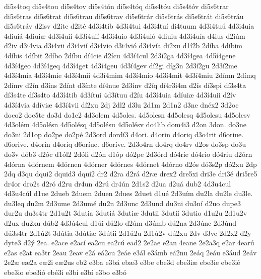 {di5s4toq
di5s4tou
di5s4tov
di5s4t^^f3n
di5s4t^^f3q
di5s4t^^f3u
di5s4t^^f3v
di5s6trar
di5s6tras
di5s6trat
di5s6trau
di5s6trav
di5s6tr^^e1r
di5s6tr^^e1s
di5s6tr^^e1t
di5s6tr^^e1u
di5s6tr^^e1v
d2isv
d2ite
d2it^^e9
4d3i4tib
4d3i4tui
4d3i4tu^^ed
di4tuum
4d3i4tu^^fa
4d3i4uia
4diui^^e1
4diui^^e6
4d3i4uii
4d3i4ui^^ed
4d3i4uio
4d3i4ui^^f3
4diuiu
4d3i4u^^eda
d4ius
d2i^^fam
d2iv
d3i4via
d3i4vii
d3i4vi^^ed
d3i4vio
d3i4vi^^f3
d3i4v^^eda
di2xu
d1^^ed2b
2d^^edba
4d^^edbim
4d^^edbis
4d^^edbit
2d^^edbo
2d^^edbu
d^^ed4cie
d2^^edcu
4d3^^ed4cul
2d3^^ed2ga
4d3^^ed4gea
4d5^^ed4gene
4d3^^ed4geo
4d3^^ed4geq
4d3^^ed4get
4d3^^ed4geu
4d3^^ed4gev
d^^ed2gi
d^^edg3n
2d3^^ed2gu
2d3^^ed2me
4d3^^ed4mia
4d3^^ed4mie
4d3^^ed4mii
4d3^^ed4mim
4d3^^ed4mio
4d3^^ed4mit
4d3^^ed4miu
2d^^edmn
2d^^edmq
2d^^edmv
d2^^edn
d3^^edns
2d^^ednt
d3^^ednte
d^^ed4nue
2d3^^ednv
d2^^edq
d^^ed4r3i4m
d2^^eds
d^^ed3spi
d^^ed3s4ta
d^^ed3s4te
d^^ed3s4to
4d3^^ed4tib
4d3^^edtui
4d3^^edtuu
d2^^edu
4d3^^ed4uia
4d^^edui^^e6
4d3^^ed4uii
d2^^edv
4d3^^ed4via
4d^^edvi^^e6
4d3^^ed4vii
d^^ed2xu
2dj
2dl2
d3lu
2d1m
2d1n2
d3ne
dn^^e9x2
3d2oc
doco2
doc5te
do3d
do1e2
4d3olem
4d5oles.
4d5olesn
4d5olesq
4d5olesu
4d5olesv
4d3ol^^e9m
4d5ol^^e9sn
4d5ol^^e9sq
4d5ol^^e9su
4d5ol^^e9sv
do4lib
dom4i3
d2on
3don.
do3ne
do3ni
2d1op
do2pe
do2p^^e9
2d3ord
dord^^ed3
d4ori.
d4orin
d4oriq
d3o4rit
d6oriue.
d6orive.
d4or^^edn
d4or^^edq
d6or^^edue.
d6or^^edve.
2d3o4rn
do4rq
do4rv
d2os
do3sp
do3u
do3v
d^^f3b3
d2^^f3c
d1^^f3l2
2d^^f3li
d2^^f3n
d1^^f3p
d^^f32pe
2d3^^f3rd
d^^f34rie
d^^f34rio
d^^f34riu
d2^^f3rn
4d^^f3rna
4d^^f3rnem
4d^^f3rnen
4d^^f3rner
4d^^f3rnes
4d^^f3rnet
4d^^f3rno
d2^^f3s
d^^f33s2p
d^^f32xu
2dp
2dq
d3qu
dqui2
dquid3
dqu^^ed2
dr2
d2ra
d2r^^e1
d2r^^e6
drex2
dre5xi
dri3e
dri3^^e9
dri5re5
dr4or
dro2s
d2r^^f3
d2ru
dr4un
d2r^^fa
dr4^^fan
2d1s2
d2ua
d2u^^e1
dub2
4d3u4cul
4d3u4c^^fal
d1ue
2dueb
2duem
2duen
2dues
2duet
d1u^^e9
2d3u^^edm
du2la
du2le
du3le.
du3leq
du2m
2d3ume
2d3um^^e9
du2n
2d3unc
2d3und
du3ni
du3n^^ed
d2uo
dupe3
dur2u
du3s4tr
2d1u2t
3dutia
3duti^^e1
3duti^^e6
3dutii
3duti^^ed
3dutio
d1u2u
2d1u2v
d2ux
du2xu
d^^fab2
4d3^^fa4cul
d1^^fai
d^^fa2lo
d2^^fam
d3^^famb
d^^fa2na
2d3^^fanc
2d3^^fand
d^^fa3s4tr
2d1^^fa2t
3d^^fatia
3d^^fati^^e6
3d^^fatii
2d1^^fa2u
2d1^^fa2v
d^^fa2xu
2dv
d3ve
2d2x2
d2y
dyte3
d2^^fd
2ea.
e2ace
e2ac^^ed
ea2cu
ea2c^^fa
ead2
2e2ae
e2an
4eane
2e2a3q
e2ar
4ear^^fa
e2as
e2at
ea3tr
2eau
2eav
e2^^e1
e^^e12cu
2e^^e1e
e3^^e1l
e3^^e1mb
e^^e12nu
2e^^e1q
2e^^e1u
e3^^e1ud
2e^^e1v
2e2^^e6
e^^e62a
e^^e62i
e^^e62us
eb2
e3ba
e3b^^e1
eb^^e63
e3be
ebe3d
ebe3i^^e6
ebe3ie
ebe3i^^e9
ebe3io
ebe3i^^f3
eb^^e93i
e3bi
e3b^^ed
e3bo
e3b^^f3
}
